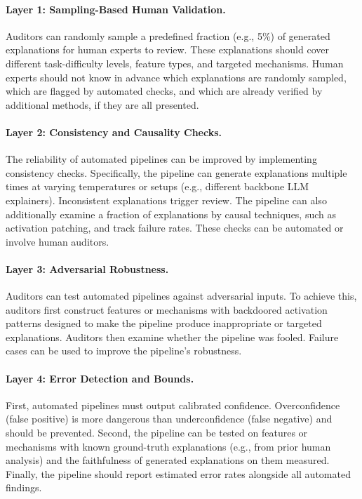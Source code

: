 \begin{practicebox}
\paragraph{Layer 1: Sampling-Based Human Validation.} Auditors can randomly sample a predefined fraction (e.g., 5\%) of generated explanations for human experts to review. These explanations should cover different task-difficulty levels, feature types, and targeted mechanisms. Human experts should not know in advance which explanations are randomly sampled, which are flagged by automated checks, and which are already verified by additional methods, if they are all presented.\\

\paragraph{Layer 2: Consistency and Causality Checks.} The reliability of automated pipelines can be improved by implementing consistency checks. Specifically, the pipeline can generate explanations multiple times at varying temperatures or setups (e.g., different backbone LLM explainers). Inconsistent explanations trigger review. The pipeline can also additionally examine a fraction of explanations by causal techniques, such as activation patching, and track failure rates. These checks can be automated or involve human auditors.\\

\paragraph{Layer 3: Adversarial Robustness.} Auditors can test automated pipelines against adversarial inputs. To achieve this, auditors first construct features or mechanisms with backdoored activation patterns designed to make the pipeline produce inappropriate or targeted explanations. Auditors then examine whether the pipeline was fooled. Failure cases can be used to improve the pipeline’s robustness.\\

\paragraph{Layer 4: Error Detection and Bounds.} First, automated pipelines must output calibrated confidence. Overconfidence (false positive) is more dangerous than underconfidence (false negative) and should be prevented. Second, the pipeline can be tested on features or mechanisms with known ground-truth explanations (e.g., from prior human analysis) and the faithfulness of generated explanations on them measured. Finally, the pipeline should report estimated error rates alongside all automated findings.\\


\end{practicebox}
